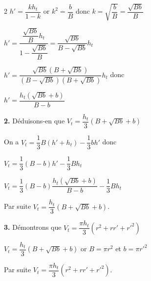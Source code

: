 \begin{multicols*}{2}
  	$h'=\dfrac{kh_{t}}{1-k}$ or  $k^2=\dfrac{b}{B}$ donc $k=\sqrt{\dfrac{b}{B}}=\dfrac{\sqrt{Bb}}{B}$\vspace{0.2cm}
  	
  	$h'=\dfrac{\dfrac{\sqrt{Bb}}{B}h_{t}}{1-\dfrac{\sqrt{Bb}}{B}}=\dfrac{\sqrt{Bb}}{B-\sqrt{Bb}}h_{t}$\vspace{0.2cm}
  	
  	$h'=\dfrac{\sqrt{Bb}\left(B+\sqrt{Bb}\right)}{\left(B-\sqrt{Bb}\right)\left(B+\sqrt{Bb}\right)}h_{t}$ donc\vspace{0.2cm} 
  	
  	$h'=\dfrac{h_{t}\left(\sqrt{Bb}+b\right)}{B-b}$ 
  	
  	\textbf{2.}  Déduisons-en que $V_{t}=\dfrac{h_{t}}{3}\left(B+\sqrt{Bb}+b\right)$
  	
  	On a $V_{t}=\dfrac{1}{3}B\left(h'+h_{t}\right)-\dfrac{1}{3}bh'$ donc \vspace{0.2cm} 
  	
  	$V_{t}=\dfrac{1}{3}\left(B-b\right)h'-\dfrac{1}{3}Bh_{t}$\vspace{0.2cm} 
  	
  	$V_{t}=\dfrac{1}{3}\left(B-b\right)\dfrac{h_{t}\left(\sqrt{Bb}+b\right)}{B-b}-\dfrac{1}{3}Bh_{t}$ \vspace{0.2cm} 
  	
  	Par suite $V_{t}=\dfrac{h_{t}}{3}\left(B+\sqrt{Bb}+b\right)$.
  	
  	\textbf{3.} Démontrons que $V_{t}=\dfrac{\pi h_{t}}{3}\left(r^2+rr'+r'^2\right)$
  	
  	$V_{t}=\dfrac{h_{t}}{3}\left(B+\sqrt{Bb}+b\right)$ or $B=\pi r^2$ et $b=\pi r'^2$
  	
  	Par suite $V_{t}=\dfrac{\pi h_{t}}{3}\left(r^2+rr'+r'^2\right)$.
  	\reto
  	\begin{center}
  	\end{center}
  	\begin{center}
  	\end{center}
  	

\end{multicols*}
